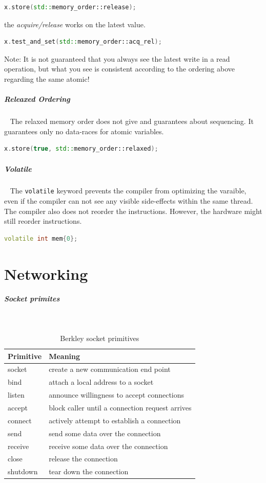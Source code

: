 \documentclass[11pt,twoside,landscape]{article}
\begin{document}
\begin{multicols}{2}
\begin{lstlisting}[language=c++,numbers=none]
x.store(std::memory_order::release);
\end{lstlisting}

the \emph{acquire/release} works on the latest value.
\begin{lstlisting}[language=c++,numbers=none]
x.test_and_set(std::memory_order::acq_rel);
\end{lstlisting}

Note: It is not guaranteed that you always see the latest write in a read operation, but what you see is consistent according to the ordering above regarding the same atomic!

\subparagraph{Releaxed Ordering} \
\label{sec:org5731090}
The relaxed memory order does not give and guarantees about sequencing.
It guarantees only no data-races for atomic variables.

\begin{lstlisting}[language=c++,numbers=none]
x.store(true, std::memory_order::relaxed);
\end{lstlisting}

\subparagraph{Volatile} \
\label{sec:org1a134f1}
The \texttt{volatile} keyword prevents the compiler from optimizing the varaible, even if the compiler can not see any visible side-effects within the same thread.
The compiler also does not reorder the instructions.
However, the hardware might still reorder instructions.

\begin{lstlisting}[language=c++,numbers=none]
volatile int mem{0};
\end{lstlisting}

\section{Networking}
\label{sec:orgf86658b}
\subparagraph{Socket primites} \
\label{sec:orgc3a23e5}
\begin{table}[htbp]
\caption{\label{tbl:berkley-socket-primitives}Berkley socket primitives}
\centering
\begin{tabular}{ll}
Primitive & Meaning\\[0pt]
\hline
socket & create a new communication end point\\[0pt]
bind & attach a local address to a socket\\[0pt]
listen & announce willingness to accept connections\\[0pt]
accept & block caller until a connection request arrives\\[0pt]
connect & actively attempt to establish a connection\\[0pt]
send & send some data over the connection\\[0pt]
receive & receive some data over the connection\\[0pt]
close & release the connection\\[0pt]
shutdown & tear down the connection\\[0pt]
\end{tabular}
\end{table}


\end{multicols}
\end{document}
